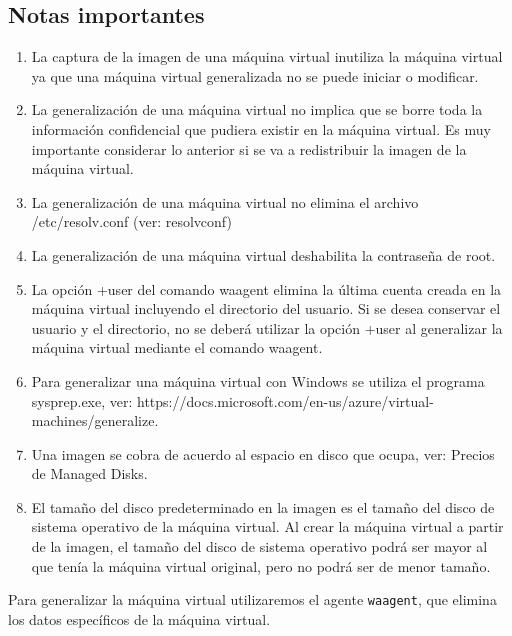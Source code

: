 \subsection{Notas importantes}

\begin{enumerate}

\item La captura de la imagen de una máquina virtual inutiliza la máquina virtual ya que una máquina virtual generalizada no se puede iniciar o modificar.

\item La generalización de una máquina virtual no implica que se borre toda la información confidencial que pudiera existir en la máquina virtual. Es muy importante considerar lo anterior si se va a redistribuir la imagen de la máquina virtual.

\item La generalización de una máquina virtual no elimina el archivo /etc/resolv.conf (ver: resolvconf)

\item La generalización de una máquina virtual deshabilita la contraseña de root.

\item La opción +user del comando waagent elimina la última cuenta creada en la máquina virtual incluyendo el directorio del usuario. Si se desea conservar el usuario y el directorio, no se deberá utilizar la opción +user al generalizar la máquina virtual mediante el comando waagent.

\item Para generalizar una máquina virtual con Windows se utiliza el programa sysprep.exe, ver: https://docs.microsoft.com/en-us/azure/virtual-machines/generalize.

\item Una imagen se cobra de acuerdo al espacio en disco que ocupa, ver: Precios de Managed Disks.

\item El tamaño del disco predeterminado en la imagen es el tamaño del disco de sistema operativo de la máquina virtual. Al crear la máquina virtual a partir de la imagen, el tamaño del disco de sistema operativo podrá ser mayor al que tenía la máquina virtual original, pero no podrá ser de menor tamaño.

\end{enumerate}

Para generalizar la máquina virtual utilizaremos el agente \texttt{waagent}, que elimina los datos específicos de la máquina virtual.

